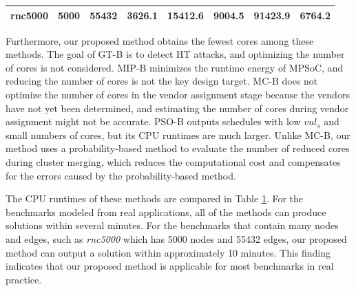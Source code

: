 \documentclass[10pt,journal, compsoc]{IEEEtran}
\begin{document}
\begin{table}[!b]
\begin{tabular}{c|c|c|c|c|c|c|c}
\hspace{-0.5em}rnc5000\hspace{-0.5em}   &\hspace{-0.5em}5000\hspace{-0.5em}   &\hspace{-0.5em}55432\hspace{-0.5em}  &\hspace{-0.5em}3626.1\hspace{-0.5em}  &\hspace{-0.5em}15412.6\hspace{-0.5em}  &\hspace{-0.5em}9004.5\hspace{-0.5em}   &\hspace{-0.5em}91423.9\hspace{-0.5em}  &\hspace{-0.8em}6764.2\hspace{-0.5em} \\

\hline
\hline
\end{tabular}
\label{table:runtime}
\end{table}








Furthermore, our proposed method obtains the fewest cores among these methods. The goal of GT-B is to detect HT attacks, and optimizing the number of cores is not considered. MIP-B minimizes the runtime energy of MPSoC, and reducing the number of cores is not the key design target. MC-B does not optimize the number of cores in the vendor assignment stage because the vendors have not yet been determined, and estimating the number of cores during vendor assignment might not be accurate. PSO-B outputs schedules with low $vul_s$ and small numbers of cores, but its CPU runtimes are much larger. Unlike MC-B, our method uses a probability-based method to evaluate the number of reduced cores during cluster merging, which reduces the computational cost and compensates for the errors caused by the probability-based method.





The CPU runtimes of these methods are compared in Table \ref{table:runtime}. For the benchmarks modeled from real applications, all of the methods can produce solutions within several minutes. For the benchmarks that contain many nodes and edges, such as \textit{rnc5000} which has 5000 nodes and 55432 edges, our proposed method can output a solution within approximately 10 minutes. This finding indicates that our proposed method is applicable for most benchmarks in real practice.
\end{document}
